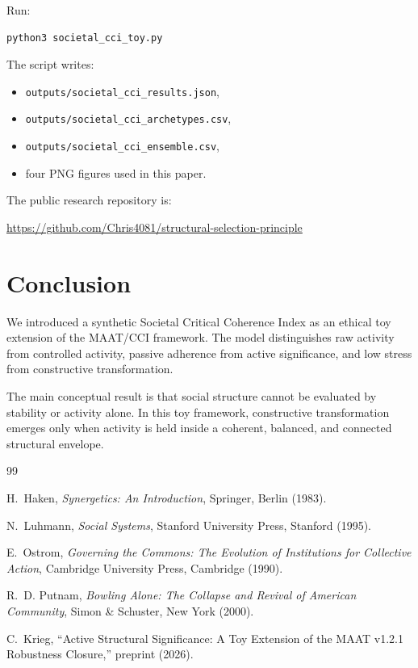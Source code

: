 \documentclass[11pt,a4paper]{article}
\begin{document}
Run:
\begin{verbatim}
python3 societal_cci_toy.py
\end{verbatim}

The script writes:
\begin{itemize}[leftmargin=1.5em]
\item \texttt{outputs/societal\_cci\_results.json},
\item \texttt{outputs/societal\_cci\_archetypes.csv},
\item \texttt{outputs/societal\_cci\_ensemble.csv},
\item four PNG figures used in this paper.
\end{itemize}

The public research repository is:
\begin{center}
\url{https://github.com/Chris4081/structural-selection-principle}
\end{center}

\section{Conclusion}

We introduced a synthetic Societal Critical Coherence Index as an ethical toy
extension of the MAAT/CCI framework.
The model distinguishes raw activity from controlled activity, passive
adherence from active significance, and low stress from constructive
transformation.

The main conceptual result is that social structure cannot be evaluated by
stability or activity alone.
In this toy framework, constructive transformation emerges only when activity
is held inside a coherent, balanced, and connected structural envelope.

\begin{thebibliography}{99}

H.~Haken,
\emph{Synergetics: An Introduction},
Springer, Berlin (1983).

N.~Luhmann,
\emph{Social Systems},
Stanford University Press, Stanford (1995).

E.~Ostrom,
\emph{Governing the Commons: The Evolution of Institutions for Collective
Action},
Cambridge University Press, Cambridge (1990).

R.~D. Putnam,
\emph{Bowling Alone: The Collapse and Revival of American Community},
Simon \& Schuster, New York (2000).

C.~Krieg,
``Active Structural Significance:
A Toy Extension of the MAAT v1.2.1 Robustness Closure,''
preprint (2026).

\end{thebibliography}
\end{document}
